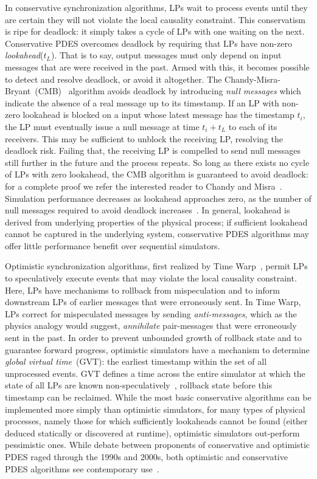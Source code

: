 In conservative synchronization algorithms, LPs wait to process events until
they are certain they will not violate the local causality constraint. This
conservatism is ripe for deadlock: it simply takes a cycle of LPs with one
waiting on the next. Conservative PDES overcomes deadlock by requiring that LPs have non-zero
\emph{lookahead}($t_{L}$). That is to say, output messages must only depend on input
messages that are were received in the past. Armed with this,
it becomes possible to detect and resolve deadlock, or avoid it altogether.
The Chandy-Misra-Bryant~(CMB)~\cite{NullMessagesBryant, NullMessagesChandy} algorithm avoids deadlock by introducing
\emph{null messages} which indicate the absence of a real
message up to its timestamp. If an LP with non-zero lookahead is blocked on a input whose latest
message has the timestamp $t_{i}$, the LP must eventually issue a
null message at time $t_{i} + t_{L}$ to each of its receivers. This may
be sufficient to unblock the receiving LP, resolving the deadlock risk. Failing that, the receiving LP is compelled to
send null messages still further in the future and the process repeats.
So long as there exists no cycle of LPs with zero lookahead, the CMB algorithm
is guaranteed to avoid deadlock: for a complete proof we refer the interested reader to Chandy and Misra~\cite{NullMessagesChandy}.
Simulation performance decreases as lookahead approaches zero, as the number
of null messages required to avoid deadlock increases~\cite{PDESFujimotoPrimer}.
In general, lookahead is derived from underlying properties of the
physical process; if sufficient lookahead cannot be
captured in the underlying system, conservative PDES algorithms may offer
little performance benefit over sequential simulators.

Optimistic synchronization algorithms, first realized by Time Warp~\cite{TimeWarp}, permit
LPs to speculatively execute events that may violate the local causality constraint.  Here, LPs have mechanisms to rollback from
mispeculation and to inform downstream LPs of earlier messages that were
erroneously sent. In Time Warp, LPs correct for mispeculated messages by
sending \emph{anti-messages}, which as the physics analogy would suggest,
\emph{annihilate} pair-messages that were erroneously sent
in the past. In order to prevent unbounded growth of rollback state and to
guarantee forward progress, optimistic simulators have a mechanism to determine
\emph{global virtual time}~(GVT): the earliest timestamp within the set of all
unprocessed events. GVT defines a time across the entire simulator at which
the state of all LPs are known non-speculatively~\cite{TimeWarp},
rollback state before this timestamp can be reclaimed. While the most
basic conservative algorithms can be implemented more simply than optimistic
simulators, for many types of physical processes, namely those for which
sufficiently lookaheads cannot be found (either deduced statically or
discovered at runtime), optimistic simulators out-perform pessimistic ones.
While debate between proponents of conservative and optimistic PDES raged
through the 1990s and 2000s, both optimistic and conservative PDES algorithms
see contemporary use~\cite{PDESRetrospective}.

